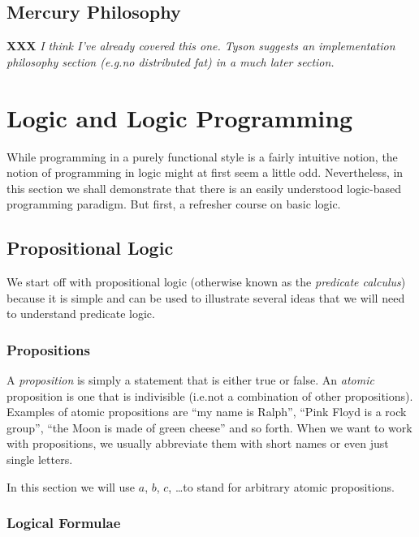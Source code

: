 \documentclass[a4paper,11pt,notitlepage,onecolumn]{article}
\makeatletter
\newcommand{\eg}%
{e.g.\@ }
\newcommand{\ie}%
{i.e.\@ }
\newcommand{\XXX}[1]%
{{\small\textbf{XXX} \emph{#1}}}
\makeatother
\begin{document}
\subsection{Mercury Philosophy}

\XXX{I think I've already covered this one.  Tyson suggests an
implementation philosophy section (\eg no distributed fat) in
a much later section.}



\section{Logic and Logic Programming}

While programming in a purely functional style is a fairly intuitive
notion, the notion of programming in logic might at first seem a little
odd.  Nevertheless, in this section we shall demonstrate that there is
an easily understood logic-based programming paradigm.  But first, a
refresher course on basic logic.

\subsection{Propositional Logic}

We start off with propositional logic (otherwise known as the
\emph{predicate calculus}) because it is simple and can be used to
illustrate several ideas that we will need to understand predicate
logic.

\subsubsection{Propositions}

A \emph{proposition} is simply a statement that is either true or false.
An \emph{atomic} proposition is one that is indivisible (\ie not a
combination of other propositions).  Examples of atomic propositions are
``my name is Ralph'', ``Pink Floyd is a rock group'', ``the Moon is made
of green cheese'' and so forth.  When we want to work with propositions,
we usually abbreviate them with short names or even just single letters.

In this section we will use $a$, $b$, $c$, \ldots to stand for arbitrary
atomic propositions.

\subsubsection{Logical Formulae}
\end{document}
